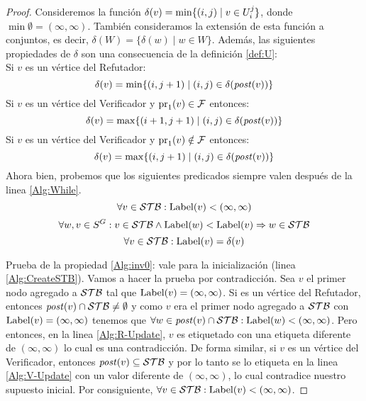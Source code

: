 \begin{proof}
Consideremos la función  $\delta(v) = \min \{(i,j) \mid v \in U^j_i\}$, donde $\min \emptyset = (\infty, \infty)$.
También consideramos la extensión de esta función a conjuntos, es decir, $\delta(W) = \{\delta(w) \mid w \in W \}$. 
Además, las siguientes propiedades de $\delta$ son una consecuencia de la definición \ref{def:U}: \\

\noindent
Si $v$ es un vértice del Refutador:
\begin{equation}\label{prop:delta-1}
 \delta(v)  = \min \{(i,j+1) \mid (i,j) \in \delta(\mathit{post}(v)) \}
\end{equation}
Si $v$ es un vértice del Verificador y $\operatorname{pr}_{1}(v) \in \mathcal{F}$ entonces:
\begin{equation}\label{prop:delta-2}
 \delta(v)  = \max \{(i+1,j+1) \mid (i,j) \in \delta(\mathit{post}(v)) \}
\end{equation}
Si $v$ es un vértice del Verificador y $\operatorname{pr}_{1}(v) \notin \mathcal{F}$ entonces:
\begin{equation}\label{prop:delta-3}
 \delta(v) = \max \{(i,j+1) \mid (i,j) \in \delta(\mathit{post}(v)) \}
\end{equation}
	Ahora bien, probemos que los siguientes predicados siempre valen después de la linea \ref{Alg:While}.
\begin{equation}\label{Alg:inv0}
	\forall v \in \mathcal{STB} : \operatorname{Label}(v) < (\infty, \infty)
\end{equation}
\begin{equation}\label{Alg:inv1}
	\forall w, v \in S^G : v \in \mathcal{STB} \wedge \operatorname{Label}(w) < \operatorname{Label}(v) \Rightarrow w \in \mathcal{STB}
\end{equation}
\begin{equation}\label{Alg:inv2}
	\forall v \in \mathcal{STB} : \operatorname{Label}(v) = \delta(v)
\end{equation}

Prueba de la propiedad \ref{Alg:inv0}: vale para la inicialización (linea \ref{Alg:CreateSTB}). Vamos a hacer la prueba por contradicción. 
Sea $v$ el primer nodo agregado a $\mathcal{STB}$ tal que $\operatorname{Label}(v) = (\infty, \infty)$.
Si es un vértice del Refutador, entonces $\mathit{post}(v) \cap \mathcal{STB} \neq \emptyset$ y como $v$ era el primer nodo agregado a $\mathcal{STB}$ con 
$\operatorname{Label}(v) = (\infty, \infty)$ tenemos que $\forall w \in \mathit{post}(v) \cap \mathcal{STB}: \operatorname{Label}(w) < (\infty, \infty)$. Pero entonces, en la linea \ref{Alg:R-Update},
$v$ es etiquetado con una etiqueta diferente de $(\infty, \infty)$ lo cual es una contradicción. 
De forma similar, si $v$ es un vértice del Verificador, entonces $\mathit{post}(v) \subseteq \mathcal{STB}$ y 
por lo tanto se lo etiqueta en la linea \ref{Alg:V-Update} con un valor diferente de $(\infty, \infty)$, lo cual contradice nuestro supuesto inicial. 
Por consiguiente, $\forall v \in \mathcal{STB} : \operatorname{Label}(v) < (\infty, \infty)$.


\end{proof}
